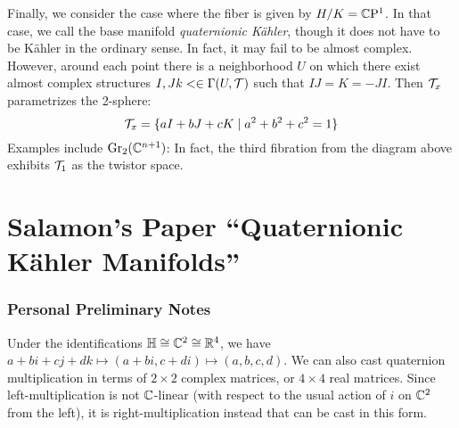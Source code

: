 \documentclass{scrartcl}
\begin{document}
Finally, we consider the case where the fiber is given by $H/K=\mathbb{C}\mathrm{P}^1$. In that case, we call the base manifold \emph{quaternionic K\"{a}hler}, though it does not have to be K\"{a}hler in the ordinary sense. In fact, it may fail to be almost complex. However, around each point there is a neighborhood $U$ on which there exist almost complex structures $I,Jk<\in \Gamma(U,\mathcal{T})$ such that $IJ=K=-JI$. Then $\mathcal{T}_x$ parametrizes the 2-sphere:
\begin{equation*}
	\mathcal{T}_x=\{aI+bJ+cK\mid a^2+b^2+c^2=1\}
\end{equation*}
Examples include $\operatorname{Gr}_2(\mathbb{C}^{n+1})$: In fact, the third fibration from the diagram above exhibits $\mathcal{T}_1$ as the twistor space.

\section{Salamon's Paper ``Quaternionic K\"{a}hler Manifolds''}

\subsubsection{Personal Preliminary Notes}

Under the identifications $\mathbb{H}\cong \mathbb{C}^2\cong \mathbb{R}^4$, we have $a+bi+cj+dk\mapsto (a+bi,c+di)\mapsto (a,b,c,d)$. We can also cast quaternion multiplication in terms of $2\times 2$ complex matrices, or $4\times 4$ real matrices. Since left-multiplication is not $\mathbb{C}$-linear (with respect to the usual action of $i$ on $\mathbb{C}^2$ from the left), it is right-multiplication instead that can be cast in this form. 

\medskip
\end{document}
